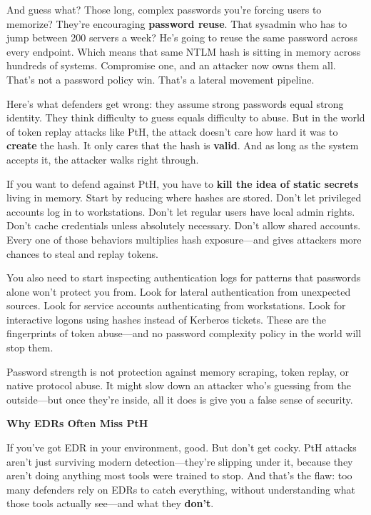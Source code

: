 And guess what? Those long, complex passwords you’re forcing users to memorize? They’re encouraging \textbf{password reuse}. That sysadmin who has to jump between 200 servers a week? He’s going to reuse the same password across every endpoint. Which means that same NTLM hash is sitting in memory across hundreds of systems. Compromise one, and an attacker now owns them all. That’s not a password policy win. That’s a lateral movement pipeline.

Here’s what defenders get wrong: they assume strong passwords equal strong identity. They think difficulty to guess equals difficulty to abuse. But in the world of token replay attacks like PtH, the attack doesn’t care how hard it was to \textbf{create} the hash. It only cares that the hash is \textbf{valid}. And as long as the system accepts it, the attacker walks right through.

If you want to defend against PtH, you have to \textbf{kill the idea of static secrets} living in memory. Start by reducing where hashes are stored. Don’t let privileged accounts log in to workstations. Don’t let regular users have local admin rights. Don’t cache credentials unless absolutely necessary. Don’t allow shared accounts. Every one of those behaviors multiplies hash exposure—and gives attackers more chances to steal and replay tokens.

You also need to start inspecting authentication logs for patterns that passwords alone won’t protect you from. Look for lateral authentication from unexpected sources. Look for service accounts authenticating from workstations. Look for interactive logons using hashes instead of Kerberos tickets. These are the fingerprints of token abuse—and no password complexity policy in the world will stop them.

Password strength is not protection against memory scraping, token replay, or native protocol abuse. It might slow down an attacker who’s guessing from the outside—but once they’re inside, all it does is give you a false sense of security.

\textbf{Why EDRs Often Miss PtH}

If you’ve got EDR in your environment, good. But don’t get cocky. PtH attacks aren’t just surviving modern detection—they’re slipping under it, because they aren’t doing anything most tools were trained to stop. And that’s the flaw: too many defenders rely on EDRs to catch everything, without understanding what those tools actually see—and what they \textbf{don’t}.

